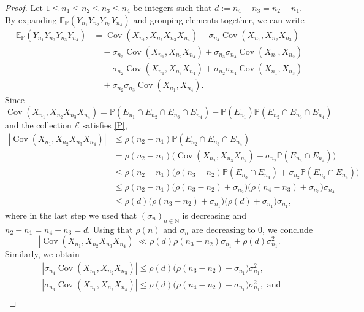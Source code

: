 \documentclass[11pt]{amsart}
\numberwithin{equation}{section}
\theoremstyle{definition}
\theoremstyle{plain}
\newcommand{\N}{{\mathbb N}}
\newcommand{\Cov}{\operatorname{Cov}}
\begin{document}
\begin{proof}
  Let $1\leq n_1\leq n_2\leq n_3\leq n_4$ be integers such that $d:=n_4-n_3=n_2-n_1$. By expanding $\mathbb{E}_{\mathbb{P}}(Y_{n_1}Y_{n_2}Y_{n_3}Y_{n_4})$  and grouping elements together, we can write
\begin{equation}
\begin{split}
\mathbb{E}_{\mathbb{P}}\left( Y_{n_1} Y_{n_2} Y_{n_3} Y_{n_4} \right) &=\Cov(X_{n_1},X_{n_2}X_{n_3}X_{n_4})-\sigma_{n_4}\Cov(X_{n_1},X_{n_2}X_{n_3})\\
&\quad-\sigma_{n_3}\Cov(X_{n_1},X_{n_2}X_{n_4})+\sigma_{n_3}\sigma_{n_4}\Cov(X_{n_1},X_{n_2})\\
&\quad-\sigma_{n_2}\Cov(X_{n_1},X_{n_3}X_{n_4})+\sigma_{n_2}\sigma_{n_4}\Cov(X_{n_1},X_{n_3})\\
&\quad+\sigma_{n_2}\sigma_{n_3}\Cov(X_{n_1},X_{n_4}).
\end{split}  \label{split1} 
\end{equation}
Since $\Cov(X_{n_1},X_{n_2}X_{n_3}X_{n_4})=\mathbb{P}(E_{n_1}\cap E_{n_2}\cap E_{n_3}\cap E_{n_4})-\mathbb{P}(E_{n_1})\mathbb{P}(E_{n_2}\cap E_{n_3}\cap E_{n_4})$ and the collection $\mathcal{E}$ satisfies \eqref{P},
\begin{align*}
    |\Cov(X_{n_1},X_{n_2}X_{n_3}X_{n_4})|&\leq \rho(n_2-n_1)\mathbb{P}(E_{n_2}\cap E_{n_3}\cap E_{n_4})\\
      &=\rho(n_2-n_1)\Big(\Cov(X_{n_2},X_{n_3}X_{n_4})+\sigma_{n_2}\mathbb{P}(E_{n_3}\cap E_{n_4})\Big) \\
      &\leq \rho(n_2-n_1)\Big(\rho(n_3-n_2)\mathbb{P}(E_{n_3}\cap E_{n_4})+\sigma_{n_2}\mathbb{P}(E_{n_3}\cap E_{n_4})\Big) \\
      &\leq \rho(n_2-n_1)\Big(\rho(n_3-n_2)+\sigma_{n_2}\Big)\Big(\rho(n_4-n_3)+\sigma_{n_3}\Big)\sigma_{n_4}\\
      &\leq \rho(d)\Big(\rho(n_3-n_2)+\sigma_{n_1}\Big)\Big(\rho(d)+\sigma_{n_1}\Big)\sigma_{n_1},
\end{align*}
where in the last step we used that $(\sigma_n)_{n\in \N}$ is decreasing and $n_2-n_1=n_4-n_3=d$. Using that $\rho(n)$ and $\sigma_n$ are decreasing to 0, we conclude 
\[ |\Cov(X_{n_1},X_{n_2}X_{n_3}X_{n_4})|\ll \rho(d)\rho(n_3-n_2)\sigma_{n_1}+\rho(d)\sigma_{n_1}^2.\]Similarly, we obtain
\begin{equation}
\begin{split}
    &|\sigma_{n_4}\Cov(X_{n_1},X_{n_2}X_{n_3})|\leq \rho(d)\Big(\rho(n_3-n_2)+\sigma_{n_1}\Big)\sigma_{n_1}^2,\\
    &|\sigma_{n_3}\Cov(X_{n_1},X_{n_2}X_{n_4})|\leq \rho(d)\Big(\rho(n_4-n_2)+\sigma_{n_1}\Big)\sigma_{n_1}^2, \text{ and }\\

\end{split}
\end{equation}
\end{proof}
\end{document}
